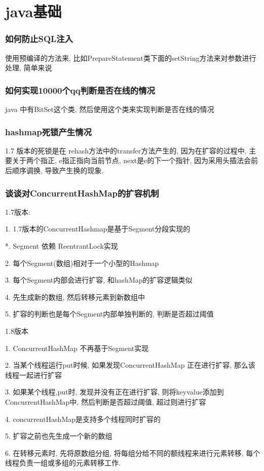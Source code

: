 \documentclass[UTF8]{ctexart}
\begin{document}
	
\section{java基础}
\subsubsection{如何防止SQL注入}
使用预编译的方法来, 比如PrepareStatement类下面的setString方法来对参数进行处理, 简单来说
\subsubsection{如何实现10000个qq判断是否在线的情况}
java 中有BitSet这个类, 然后使用这个类来实现判断是否在线的情况 \par
\subsubsection{hashmap死锁产生情况}
1.7 版本的死锁是在 rehash方法中的transfer方法产生的, 因为在扩容的过程中, 主要关于两个指正, e指正指向当前节点, next是e的下一个指针, 因为采用头插法会前后顺序调换, 导致产生换的现象. \par
\subsubsection{谈谈对ConcurrentHashMap的扩容机制}
1.7版本: \par
1. 1.7版本的ConcurrentHashmap是基于Segment分段实现的\par
*. Segment 依赖 ReentrantLock实现 \par
2. 每个Segment(数组)相对于一个小型的Hashmap \par
3. 每个Segment内部会进行扩容, 和hashMap的扩容逻辑类似 \par
4. 先生成新的数组, 然后转移元素到新数组中 \par
5. 扩容的判断也是每个Segment内部单独判断的, 判断是否超过阈值 \par
1.8版本 \par
1. ConcurrentHashMap 不再基于Segment实现 \par
2. 当某个线程运行put时候, 如果发现ConcurrentHashMap 正在进行扩容, 那么该线程一起进行扩容 \par
3. 如果某个线程,put时, 发现并没有正在进行扩容, 则将keyvalue添加到ConcurrentHashMap中, 然后判断是否超过阈值, 超过则进行扩容 \par
4. concurrentHashMap是支持多个线程同时扩容的 \par
5. 扩容之前也先生成一个新的数组 \par
6. 在转移元素时, 先将原数组分组, 将每组分给不同的额线程来进行元素转移, 每个线程负责一组或多组的元素转移工作. \par
\end{document}
